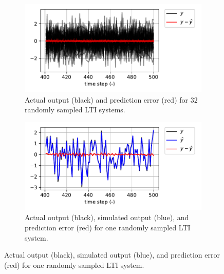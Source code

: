 \documentclass{article}
\begin{document}
\begin{figure}
    \centering

    \begin{subfigure}[t]{0.49\textwidth}
        \centering
        \includegraphics[width=\textwidth]{fig/lin_sim_batch.pdf}
        \caption{Actual output (black) and prediction error (red) for $32$ randomly sampled LTI systems.}
        \label{fig:lin_sim_batch}
    \end{subfigure}
    \hfill
    \begin{subfigure}[t]{0.49\textwidth}
        \centering
        \includegraphics[width=\textwidth]{fig/lin_sim_single.pdf}
        \caption{Actual output (black), simulated output (blue), and prediction error (red) for one randomly sampled LTI system.}
        \label{fig:lin_sim_single}
    \end{subfigure}


\end{figure}
\end{document}
